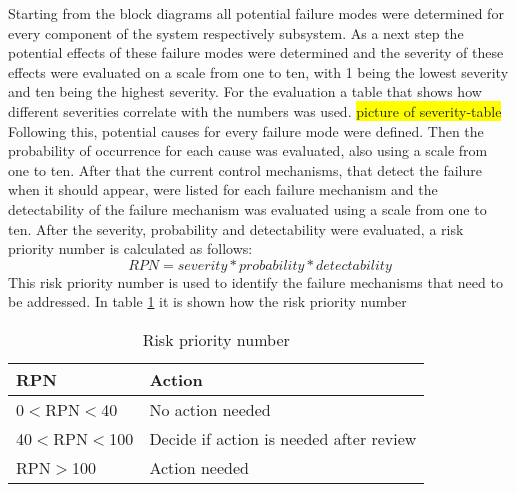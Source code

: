 \documentclass[ExampleMasters.tex]{subfiles}
\begin{document}
Starting from the block diagrams all potential failure modes were determined for every component of the system respectively subsystem. As a next step the potential effects of these failure modes were determined and the severity of these effects were evaluated on a scale from one to ten,  with 1 being the lowest severity and ten being the highest severity. For the evaluation a table that shows how different severities correlate with the numbers was used. \colorbox{yellow}{picture of severity-table}
Following this, potential causes for every failure mode were defined. Then the probability of occurrence for each cause was evaluated, also using a scale from one to ten.
After that the current control mechanisms, that detect the failure when it should appear, were listed for each failure mechanism and the detectability of the failure mechanism was evaluated using a scale from one to ten.
After the severity, probability and detectability were evaluated, a risk priority number is calculated as follows: 
\begin{equation*}
RPN=severity*probability*detectability
\end{equation*}      
This risk priority number is used to identify the failure mechanisms that need to be addressed. In table \ref{tab:RPN} it is shown how the risk priority number  
\begin{table}[h]
	\centering
	\caption{Risk priority number}
	\label{tab:RPN}
	\begin{tabular}{l|l|}
		RPN   & Action  \\ \hline
		0$<$RPN$<$40     &       No action needed           \\
		40$<$RPN$<$100   &      Decide if action is needed after review      \\
		RPN$>$100 &      Action needed         \\
		
	\end{tabular} \\
\end{table}
\end{document}
